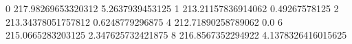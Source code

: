 0 217.98269653320312 5.2637939453125
1 213.21157836914062 0.49267578125
2 213.34378051757812 0.6248779296875
4 212.71890258789062 0.0
6 215.0665283203125 2.347625732421875
8 216.8567352294922 4.1378326416015625
